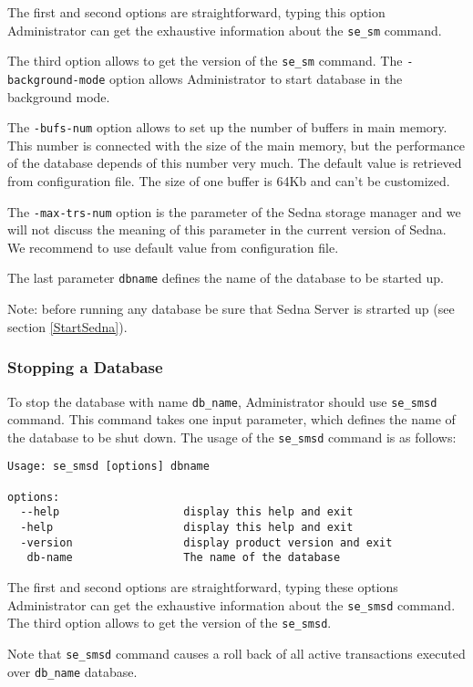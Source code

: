 \documentclass[a4paper,12pt]{article}
\begin{document}
The first and second options are straightforward, typing this option Administrator can get the exhaustive information about the \verb!se_sm! command.

The third option allows to get the version of the \verb!se_sm! command.
The \verb!-background-mode! option allows Administrator to start database in the background mode.

The \verb!-bufs-num! option allows to set up the number of buffers in main memory. This number is connected with the size of the main memory, but the performance of the database depends of this number very much. The default value is retrieved from configuration file. The size of one buffer is 64Kb and can't be customized.


The \verb!-max-trs-num! option is the parameter of the Sedna storage manager and we will not discuss the meaning of this parameter in the current version of Sedna. We recommend to use default value from configuration file.


The last parameter \verb!dbname!  defines the name of the database to be started up. 


Note: before running any database be sure that Sedna Server is strarted up (see section \ref{StartSedna}).

\subsubsection{Stopping a Database}

To stop the database with name \verb!db_name!, Administrator should use \verb!se_smsd! command. This command takes one input parameter, which defines the name of the database to be shut down. The usage of the \verb!se_smsd! command is as follows:

\begin{verbatim}
Usage: se_smsd [options] dbname

options:
  --help                   display this help and exit
  -help                    display this help and exit
  -version                 display product version and exit
   db-name                 The name of the database
\end{verbatim}

The first and second options are straightforward, typing these options Administrator can get the exhaustive information about the \verb!se_smsd! command.
The third option allows to get the version of the \verb!se_smsd!.

Note that \verb!se_smsd! command causes a roll back of all active transactions executed over \verb!db_name! database.
\end{document}
